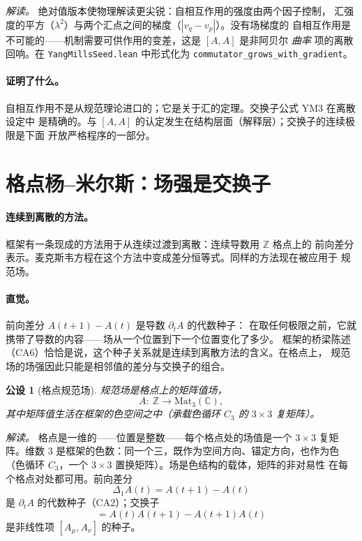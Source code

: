 \documentclass[aps,prd,preprint,superscriptaddress,amsmath,amssymb]{revtex4-2}
\newtheorem{postulate}{公设}[section]
\begin{document}
\emph{解读。} 绝对值版本使物理解读更尖锐：自相互作用的强度由两个因子控制，
汇强度的平方（$\lambda^2$）与两个汇点之间的梯度（$|v_q-v_p|$）。没有场梯度的
自相互作用是不可能的——机制需要可供作用的变差，这是 $[A,A]$ 是非阿贝尔
\emph{曲率} 项的离散回响。在 \texttt{YangMillsSeed.lean} 中形式化为
\texttt{commutator\_grows\_with\_}\allowbreak\texttt{gradient}。

\paragraph{证明了什么。}
自相互作用不是从规范理论进口的；它是关于汇的定理。交换子公式 YM3 在离散设定中
是精确的。与 $[A,A]$ 的认定发生在结构层面（解释层）；交换子的连续极限是下面
开放严格程序的一部分。

\section{格点杨--米尔斯：场强是交换子}
\label{sec:lattice}

\paragraph{连续到离散的方法。}
框架有一条现成的方法用于从连续过渡到离散：连续导数用 $\mathbb{Z}$ 格点上的
前向差分表示。麦克斯韦方程在这个方法中变成差分恒等式。同样的方法现在被应用于
规范场。

\paragraph{直觉。} 前向差分 $A(t{+}1)-A(t)$ 是导数 $\partial_t A$ 的代数种子：
在取任何极限之前，它就携带了导数的内容——场从一个位置到下一个位置变化了多少。
框架的桥梁陈述（CA6）恰恰是说，这个种子关系就是连续到离散方法的含义。在格点上，
规范场的场强因此只能是相邻值的差分与交换子的组合。

\begin{postulate}[格点规范场]
\label{post:lattice}
规范场是格点上的矩阵值场，
\begin{equation}
A:\ \mathbb{Z}\to \mathrm{Mat}_3(\mathbb{C}),
\end{equation}
其中矩阵值生活在框架的色空间之中（承载色循环 $C_3$ 的 $3\times3$ 复矩阵）。
\end{postulate}

\emph{解读。} 格点是一维的——位置是整数——每个格点处的场值是一个 $3\times3$
复矩阵。维数 $3$ 是框架的色数：同一个三，既作为空间方向、锚定方向，也作为色
（色循环 $C_3$，一个 $3\times3$ 置换矩阵）。场是色结构的载体，矩阵的非对易性
在每个格点对处都可用。前向差分
\begin{equation}
\Delta_1 A(t)=A(t{+}1)-A(t)
\label{eq:grad}
\end{equation}
是 $\partial_t A$ 的代数种子（CA2）；交换子
\begin{equation}
[A(t),A(t{+}1)]=A(t)A(t{+}1)-A(t{+}1)A(t)
\end{equation}
是非线性项 $[A_\mu,A_\nu]$ 的种子。
\end{document}
